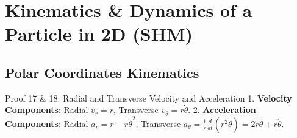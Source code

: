 \documentclass[11pt, a4paper]{report}
\begin{document}
\chapter{Kinematics \& Dynamics of a Particle in 2D (SHM)}

\section{Polar Coordinates Kinematics}

\begin{theorembox}{Proof 17 \& 18: Radial and Transverse Velocity and Acceleration}
1. \textbf{Velocity Components}: Radial $v_r = \dot{r}$, Transverse $v_\theta = r\dot{\theta}$.
2. \textbf{Acceleration Components}: Radial $a_r = \ddot{r} - r\dot{\theta}^2$, Transverse $a_\theta = \frac{1}{r}\frac{d}{dt}(r^2\dot{\theta}) = 2\dot{r}\dot{\theta} + r\ddot{\theta}$.
\end{theorembox}
\end{document}
